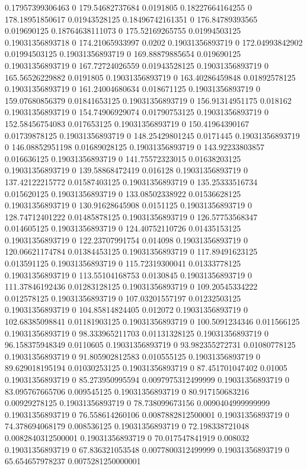 0.17957399306463 0 179.54682737684 0.0191805
0.18227664164255 0 178.18951850617 0.01943528125
0.18496742161351 0 176.84789393565 0.019690125
0.18764638111073 0 175.52169265755 0.01994503125
0.19031356893718 0 174.21065933997 0.0202
0.19031356893719 0 172.04993842902 0.01994503125
0.19031356893719 0 169.88879885654 0.019690125
0.19031356893719 0 167.72724026559 0.01943528125
0.19031356893719 0 165.56526229882 0.0191805
0.19031356893719 0 163.40286459848 0.01892578125
0.19031356893719 0 161.24004680634 0.018671125
0.19031356893719 0 159.07680856379 0.01841653125
0.19031356893719 0 156.91314951175 0.018162
0.19031356893719 0 154.74906929074 0.01790753125
0.19031356893719 0 152.58456754083 0.017653125
0.19031356893719 0 150.41964390167 0.01739878125
0.19031356893719 0 148.25429801245 0.0171445
0.19031356893719 0 146.08852951198 0.01689028125
0.19031356893719 0 143.92233803857 0.016636125
0.19031356893719 0 141.75572323015 0.01638203125
0.19031356893719 0 139.58868472419 0.016128
0.19031356893719 0 137.42122215772 0.01587403125
0.19031356893719 0 135.25333516734 0.015620125
0.19031356893719 0 133.08502338922 0.01536628125
0.19031356893719 0 130.91628645908 0.0151125
0.19031356893719 0 128.74712401222 0.01485878125
0.19031356893719 0 126.57753568347 0.014605125
0.19031356893719 0 124.40752110726 0.01435153125
0.19031356893719 0 122.23707991754 0.014098
0.19031356893719 0 120.06621174784 0.01384453125
0.19031356893719 0 117.89491623125 0.013591125
0.19031356893719 0 115.72319300041 0.01333778125
0.19031356893719 0 113.55104168753 0.0130845
0.19031356893719 0 111.37846192436 0.01283128125
0.19031356893719 0 109.20545334222 0.012578125
0.19031356893719 0 107.03201557197 0.01232503125
0.19031356893719 0 104.85814824405 0.012072
0.19031356893719 0 102.68385098841 0.01181903125
0.19031356893719 0 100.5091234346 0.011566125
0.19031356893719 0 98.333965211703 0.01131328125
0.19031356893719 0 96.158375948349 0.0110605
0.19031356893719 0 93.982355272731 0.01080778125
0.19031356893719 0 91.805902812583 0.010555125
0.19031356893719 0 89.629018195194 0.01030253125
0.19031356893719 0 87.451701047402 0.01005
0.19031356893719 0 85.273950995594 0.0097975312499999
0.19031356893719 0 83.095767665706 0.009545125
0.19031356893719 0 80.917150683216 0.00929278125
0.19031356893719 0 78.738099673156 0.0090404999999999
0.19031356893719 0 76.558614260106 0.0087882812500001
0.19031356893719 0 74.378694068179 0.008536125
0.19031356893719 0 72.198338721048 0.0082840312500001
0.19031356893719 0 70.017547841919 0.008032
0.19031356893719 0 67.836321053548 0.0077800312499999
0.19031356893719 0 65.654657978237 0.0075281250000001
